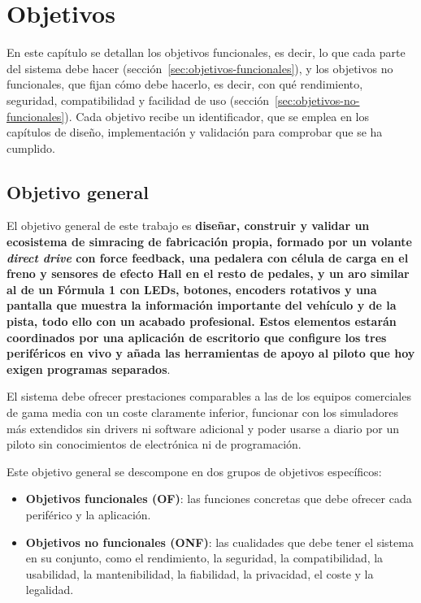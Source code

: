 \chapter{Objetivos}
\label{cap:objetivos}

 En este capítulo se detallan los objetivos funcionales, es decir, lo que cada parte del sistema debe hacer (sección~\ref{sec:objetivos-funcionales}), y los objetivos no funcionales, que fijan cómo debe hacerlo, es decir, con qué rendimiento, seguridad, compatibilidad y facilidad de uso (sección~\ref{sec:objetivos-no-funcionales}). Cada objetivo recibe un identificador, que se emplea en los capítulos de diseño, implementación y validación para comprobar que se ha cumplido.

\section{Objetivo general}
\label{sec:objetivo-general}

El objetivo general de este trabajo es \textbf{diseñar, construir y validar un ecosistema de simracing de fabricación propia, formado por un volante \emph{direct drive} con force feedback, una pedalera con célula de carga en el freno y sensores de efecto Hall en el resto de pedales, y un aro similar al de un Fórmula 1 con LEDs, botones, encoders rotativos y una pantalla que muestra la información importante del vehículo y de la pista, todo ello con un acabado profesional. Estos elementos estarán coordinados por una aplicación de escritorio que configure los tres periféricos en vivo y añada las herramientas de apoyo al piloto que hoy exigen programas separados}.

El sistema debe ofrecer prestaciones comparables a las de los equipos comerciales de gama media con un coste claramente inferior, funcionar con los simuladores más extendidos sin drivers ni software adicional y poder usarse a diario por un piloto sin conocimientos de electrónica ni de programación.

Este objetivo general se descompone en dos grupos de objetivos específicos:

\begin{itemize}
	\item \textbf{Objetivos funcionales (OF)}: las funciones concretas que debe ofrecer cada periférico y la aplicación.
	\item \textbf{Objetivos no funcionales (ONF)}: las cualidades que debe tener el sistema en su conjunto, como el rendimiento, la seguridad, la compatibilidad, la usabilidad, la mantenibilidad, la fiabilidad, la privacidad, el coste y la legalidad.
\end{itemize}

